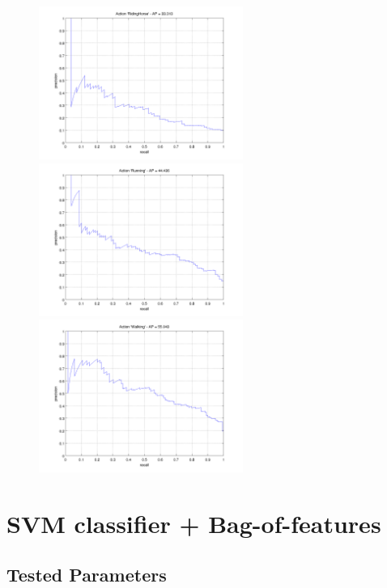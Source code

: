 \documentclass[10pt,a4paper]{llncs}
\begin{document}
\begin{figure}
\begin{minipage}{0.5\linewidth}
\end{minipage}
\begin{minipage}{0.5\linewidth}
\includegraphics[height=5cm]{img/KNN_BOF_PR_RidingHorse.png}
\end{minipage}
\begin{minipage}{0.5\linewidth}
\includegraphics[height=5cm]{img/KNN_BOF_PR_Running.png}
\end{minipage}
\begin{minipage}{0.5\linewidth}
\includegraphics[height=5cm]{img/KNN_BOF_PR_Walking.png}
\end{minipage}
\end{figure}


\newpage
\section{SVM classifier + Bag-of-features}
\subsection{Tested Parameters}
\end{document}
